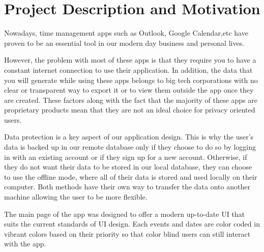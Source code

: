 \chapter{\centering Project Description and Motivation} %

\label{Chapter Project Description} %

Nowadays, time management apps such as Outlook, Google Calendar,etc have proven to be an essential tool in our modern day business and personal lives.

However, the problem with most of these apps is that they require you to have a constant internet connection to use their application. In addition,
the data that you will generate while using these apps belongs to big tech corporations with no clear or transparent way to export it
or to view them outside the app once they are created. These factors along with the fact that the majority of these apps are proprietary 
products mean that they are not an ideal choice for privacy oriented users.


Data protection is a key aspect of our application design. This is why the user's data is backed up in our remote database 
only if they choose to do so by logging in with an existing account or if they sign up for a new account. Otherwise, if they do not want 
their data to be stored in our local database, they can choose to use the offline mode, where all of their data is stored and used locally
on their computer. Both methods have their own way to transfer the data onto another machine allowing the user to be more flexible.  

The main page of the app was designed to offer a modern up-to-date UI that suits the current standards of UI design. Each events and dates 
are color coded in vibrant colors based on their priority so that color blind users can still interact with the app. 

